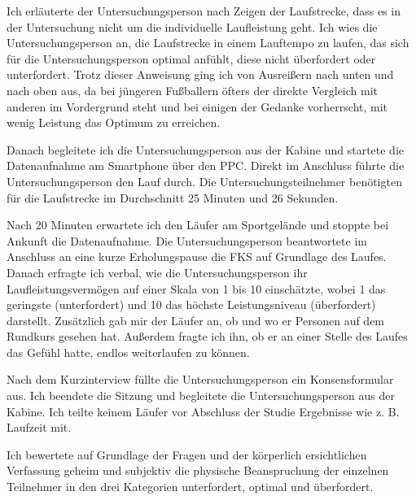 Ich erläuterte der Untersuchungsperson nach Zeigen der Laufstrecke, dass es in der Untersuchung nicht um die individuelle Laufleistung geht. Ich wies die Untersuchungsperson an, die Laufstrecke in einem Lauftempo zu laufen, das sich für die Untersuchungsperson optimal anfühlt, diese nicht überfordert oder unterfordert. Trotz dieser Anweisung ging ich von Ausreißern nach unten und nach oben aus, da bei jüngeren Fußballern öfters der direkte Vergleich mit anderen im Vordergrund steht und bei einigen der Gedanke vorherrscht, mit wenig Leistung das Optimum zu erreichen. 

Danach begleitete ich die Untersuchungsperson aus der Kabine und startete die Datenaufnahme am Smartphone über den \ac{PPC}. Direkt im Anschluss führte die Untersuchungsperson den Lauf durch. Die Untersuchungsteilnehmer benötigten für die Laufstrecke im Durchschnitt 25 Minuten und 26 Sekunden. 

Nach 20 Minuten erwartete ich den Läufer am Sportgelände und stoppte bei Ankunft die Datenaufnahme. Die Untersuchungsperson beantwortete im Anschluss an eine kurze Erholungspause die \ac{FKS} auf Grundlage des Laufes. Danach erfragte ich verbal, wie die Untersuchungsperson ihr Laufleistungsvermögen auf einer Skala von 1 bis 10 einschätzte, wobei 1 das geringste (unterfordert) und 10 das höchste Leistungsniveau (überfordert) darstellt. Zusätzlich gab mir der Läufer an, ob und wo er Personen auf dem Rundkurs gesehen hat. Außerdem fragte ich ihn, ob er an einer Stelle des Laufes das Gefühl hatte, endlos weiterlaufen zu können. 

Nach dem Kurzinterview füllte die Untersuchungsperson ein Konsensformular aus. Ich beendete die Sitzung und begleitete die Untersuchungsperson aus der Kabine. Ich teilte keinem Läufer vor Abschluss der Studie Ergebnisse wie z. B. Laufzeit mit. 

Ich bewertete auf Grundlage der Fragen und der körperlich ersichtlichen Verfassung geheim und subjektiv die physische Beanspruchung der einzelnen Teilnehmer in den drei Kategorien unterfordert, optimal und überfordert.


